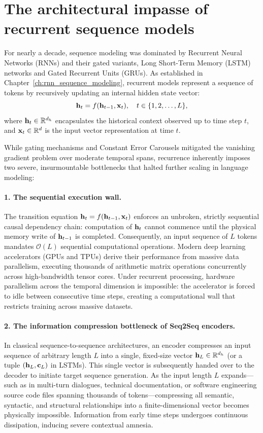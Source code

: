 \documentclass[../../main.tex]{subfiles}
\begin{document}
\section{The architectural impasse of recurrent sequence models}
\label{sec:recurrent_impasse}

For nearly a decade, sequence modeling was dominated by Recurrent Neural Networks (RNNs) and their gated variants, Long Short-Term Memory (LSTM) networks and Gated Recurrent Units (GRUs). As established in Chapter~\ref{ch:rnn_sequence_modeling}, recurrent models represent a sequence of tokens by recursively updating an internal hidden state vector:
\begin{equation}
\label{eq:recurrent_transition_step}
\mathbf{h}_t = f(\mathbf{h}_{t-1}, \mathbf{x}_t), \quad t \in \{1, 2, \dots, L\},
\end{equation}
where $\mathbf{h}_t \in \mathbb{R}^{d_h}$ encapsulates the historical context observed up to time step $t$, and $\mathbf{x}_t \in \mathbb{R}^d$ is the input vector representation at time $t$.

While gating mechanisms and Constant Error Carousels mitigated the vanishing gradient problem over moderate temporal spans, recurrence inherently imposes two severe, insurmountable bottlenecks that halted further scaling in language modeling:

\paragraph{1. The sequential execution wall.}
The transition equation $\mathbf{h}_t = f(\mathbf{h}_{t-1}, \mathbf{x}_t)$ enforces an unbroken, strictly sequential causal dependency chain: computation of $\mathbf{h}_t$ cannot commence until the physical memory write of $\mathbf{h}_{t-1}$ is completed. Consequently, an input sequence of $L$ tokens mandates $\mathcal{O}(L)$ sequential computational operations.
Modern deep learning accelerators (GPUs and TPUs) derive their performance from massive data parallelism, executing thousands of arithmetic matrix operations concurrently across high-bandwidth tensor cores. Under recurrent processing, hardware parallelism across the temporal dimension is impossible: the accelerator is forced to idle between consecutive time steps, creating a computational wall that restricts training across massive datasets.

\paragraph{2. The information compression bottleneck of Seq2Seq encoders.}
In classical sequence-to-sequence architectures, an encoder compresses an input sequence of arbitrary length $L$ into a single, fixed-size vector $\mathbf{h}_L \in \mathbb{R}^{d_h}$ (or a tuple $(\mathbf{h}_L, \mathbf{c}_L)$ in LSTMs). This single vector is subsequently handed over to the decoder to initiate target sequence generation.
As the input length $L$ expands---such as in multi-turn dialogues, technical documentation, or software engineering source code files spanning thousands of tokens---compressing all semantic, syntactic, and structural relationships into a finite-dimensional vector becomes physically impossible. Information from early time steps undergoes continuous dissipation, inducing severe contextual amnesia.
\end{document}
